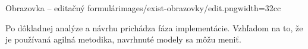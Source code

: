{Obrazovka -- editačný formulár}{images/exist-obrazovky/edit.png}{width=32cc} 

%
%
%
%
%
%
%
%
%

Po dôkladnej analýze a návrhu prichádza fáza implementácie. Vzhľadom na to, že je používaná agilná metodika, navrhnuté modely sa môžu meniť.

